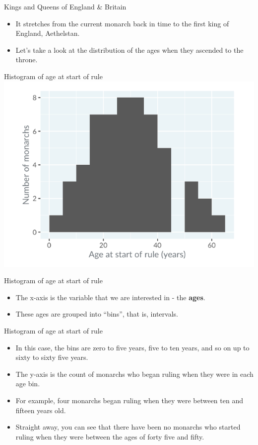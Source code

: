 \documentclass[
  ignorenonframetext,
]{beamer}
\begin{document}
\begin{frame}{Kings and Queens of England \& Britain}
\label{kings-and-queens-of-england-britain-1}
\begin{itemize}
\item
  It stretches from the current monarch back in time to the first king
  of England, Aethelstan.
\item
  Let's take a look at the distribution of the ages when they ascended
  to the throne.
\end{itemize}
\end{frame}

\begin{frame}{Histogram of age at start of rule}
\label{histogram-of-age-at-start-of-rule}
\includegraphics{../images/im7.png}
\end{frame}

\begin{frame}{Histogram of age at start of rule}
\label{histogram-of-age-at-start-of-rule-1}
\begin{itemize}
\item
  The x-axis is the variable that we are interested in - the
  \textbf{ages}.
\item
  These ages are grouped into ``bins'', that is, intervals.
\end{itemize}
\end{frame}

\begin{frame}{Histogram of age at start of rule}
\label{histogram-of-age-at-start-of-rule-2}
\begin{itemize}
\item
  In this case, the bins are zero to five years, five to ten years, and
  so on up to sixty to sixty five years.
\item
  The y-axis is the count of monarchs who began ruling when they were in
  each age bin.
\item
  For example, four monarchs began ruling when they were between ten and
  fifteen years old.
\item
  Straight away, you can see that there have been no monarchs who
  started ruling when they were between the ages of forty five and
  fifty.
\end{itemize}
\end{frame}
\end{document}
